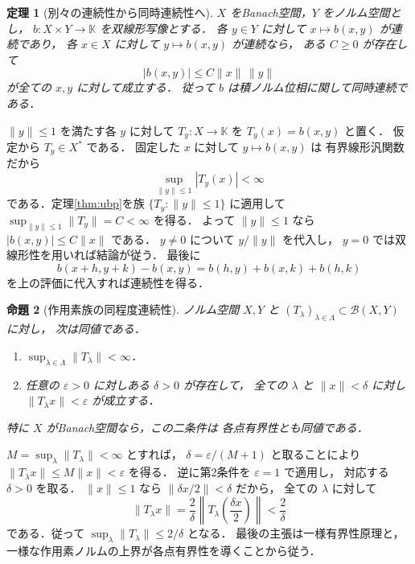 \documentclass[a5paper,10pt,onecolumn]{jsarticle}
\makeatletter
\theoremstyle{mathnotetheorem}
\newtheorem{theorem}{定理}[section]
\newtheorem{proposition}[theorem]{命題}
\renewcommand{\proofname}{証明}
\renewenvironment{proof}[1][\proofname]{%
  \par\pushQED{\qed}\normalfont\topsep4\p@\@plus2\p@\relax
  \trivlist\item[\hskip\labelsep\bfseries #1]\ignorespaces
}{\popQED\endtrivlist\@endpefalse}
\makeatother
\begin{document}
\begin{theorem}[別々の連続性から同時連続性へ]\label{thm:bilinear}
$X$ をBanach空間，$Y$ をノルム空間とし，
$b:X\times Y\to\mathbb K$ を双線形写像とする．
各 $y\in Y$ に対して $x\mapsto b(x,y)$ が連続であり，
各 $x\in X$ に対して $y\mapsto b(x,y)$ が連続なら，
ある $C\ge0$ が存在して
\[
 |b(x,y)|\le C\|x\|\,\|y\|
\]
が全ての $x,y$ に対して成立する．
従って $b$ は積ノルム位相に関して同時連続である．
\end{theorem}
\begin{proof}
$\|y\|\le1$ を満たす各 $y$ に対して
$T_y:X\to\mathbb K$ を $T_y(x)=b(x,y)$ と置く．
仮定から $T_y\in X^*$ である．
固定した $x$ に対して $y\mapsto b(x,y)$ は
有界線形汎関数だから
\[
 \sup_{\|y\|\le1}|T_y(x)|<\infty
\]
である．定理\ref{thm:ubp}を族
$\{T_y:\|y\|\le1\}$ に適用して
$\sup_{\|y\|\le1}\|T_y\|=C<\infty$ を得る．
よって $\|y\|\le1$ なら
$|b(x,y)|\le C\|x\|$ である．
$y\ne0$ について $y/\|y\|$ を代入し，
$y=0$ では双線形性を用いれば結論が従う．
最後に
\[
 b(x+h,y+k)-b(x,y)
 =b(h,y)+b(x,k)+b(h,k)
\]
を上の評価に代入すれば連続性を得る．
\end{proof}

\begin{proposition}[作用素族の同程度連続性]\label{prop:equicont}
ノルム空間 $X,Y$ と
$(T_\lambda)_{\lambda\in\Lambda}\subset\mathcal B(X,Y)$ に対し，
次は同値である．
\begin{enumerate}
\item $\sup_{\lambda\in\Lambda}\|T_\lambda\|<\infty$．
\item 任意の $\varepsilon>0$ に対しある $\delta>0$ が存在して，
      全ての $\lambda$ と $\|x\|<\delta$ に対し
      $\|T_\lambda x\|<\varepsilon$ が成立する．
\end{enumerate}
特に $X$ がBanach空間なら，この二条件は
各点有界性とも同値である．
\end{proposition}
\begin{proof}
$M=\sup_\lambda\|T_\lambda\|<\infty$ とすれば，
$\delta=\varepsilon/(M+1)$ と取ることにより
$\|T_\lambda x\|\le M\|x\|<\varepsilon$ を得る．
逆に第2条件を $\varepsilon=1$ で適用し，
対応する $\delta>0$ を取る．
$\|x\|\le1$ なら
$\|\delta x/2\|<\delta$ だから，
全ての $\lambda$ に対して
\[
 \|T_\lambda x\|
 =\frac{2}{\delta}
   \left\|T_\lambda\!\left(\frac{\delta x}{2}\right)\right\|
 <\frac{2}{\delta}
\]
である．従って $\sup_\lambda\|T_\lambda\|\le2/\delta$ となる．
最後の主張は一様有界性原理と，
一様な作用素ノルムの上界が各点有界性を導くことから従う．
\end{proof}
\end{document}
